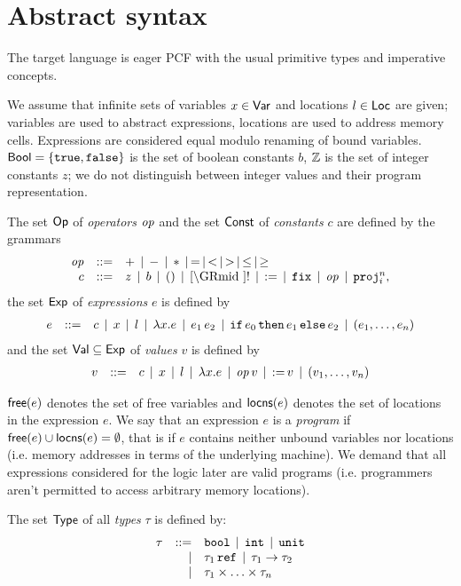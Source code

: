 \documentclass[12pt,a4paper]{article}
\begin{document}

\section{Abstract syntax}

The target language is eager PCF with the usual primitive types and imperative concepts.

We assume that infinite sets of variables $x \in \mathsf{Var}$ and locations $l \in \mathsf{Loc}$ are given;
variables are used to abstract expressions, locations are used to address memory cells.
Expressions are considered equal modulo renaming of bound variables.
$\mathsf{Bool}=\{\mathtt{true},\mathtt{false}\}$ is the set of boolean constants $b$, $\mathbb Z$ is the set of integer
constants $z$; we do not distinguish between integer values and their program representation.

\begin{definition}[Expressions]
  The set $\mathsf{Op}$ of {\em operators} $\mathit{op}$ and the set $\mathsf{Const}$ of {\em constants} $c$
  are defined by the grammars
  \[\GRbeg
    \op \GRis + \GRmid - \GRmid * \GRmid = \GRmid < \GRmid > \GRmid \le \GRmid \ge \\
    c \GRis z \GRmid b \GRmid \unit \GRmid \cref \GRmid !
             \GRmid \assign \GRmid \fix \GRmid \op \GRmid \proj{n}{i},
  \GRend\]
  the set $\mathsf{Exp}$ of {\em expressions} $e$ is defined by
  \[\begin{array}{rrlll}
    e & ::= & c \,\mid\, x \,\mid\, l \,\mid\, \lambda x.e \,\mid\, e_1\,e_2
      \,\mid\, \mathtt{if}\,e_0\,\mathtt{then}\,e_1\,\mathtt{else}\,e_2 \,\mid\, (e_1,\ldots,e_n)
  \end{array}\]
  and the set $\mathsf{Val} \subseteq \mathsf{Exp}$ of {\em values} $v$ is defined by
  \[\begin{array}{rrlll}
    v & ::= & c \,\mid\, x \,\mid\, l \,\mid\, \lambda x.e \,\mid\, \mathit{op}\,v \,\mid\, \mathtt{:=}\,v
      \,\mid\, (v_1,\ldots,v_n)
  \end{array}\]
\end{definition}

$\mathsf{free}(e)$ denotes the set of free variables and $\mathsf{locns}(e)$ denotes the set of locations in the
expression $e$. We say that an expression $e$ is a {\em program} if $\mathsf{free}(e)\cup\mathsf{locns}(e)=\emptyset$,
that is if $e$ contains neither unbound variables nor
locations (i.e. memory addresses in terms of the underlying machine). We demand that all expressions
considered for the logic later are valid programs (i.e. programmers aren't permitted to access
arbitrary memory locations).

\begin{definition}[Types]
  The set $\mathsf{Type}$ of all {\em types} $\tau$ is defined by:
  \[\begin{array}{rrlll}
  \tau & ::= & \mathtt{bool} \,\mid\, \mathtt{int} \,\mid\, \mathtt{unit}
  \\ & \mid & \tau_1\,\mathtt{ref} \,\mid\, \tau_1\to\tau_2
  \\ & \mid & \tau_1 \times \ldots \times \tau_n
  \end{array}\]
\end{definition}
\end{document}
